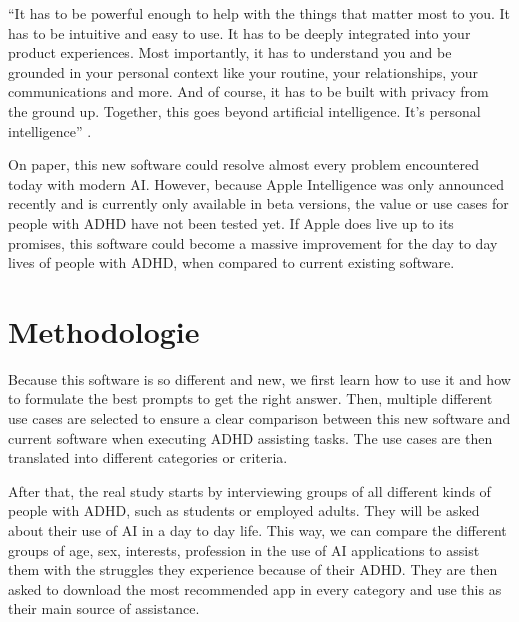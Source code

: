 \documentclass[english]{hogent-article}
\begin{document}
“It has to be powerful enough to help with the things that matter most to you. It has to be intuitive and easy to use. It has to be deeply integrated into your product experiences. Most importantly, it has to understand you and be grounded in your personal context like your routine, your relationships, your communications and more. And of course, it has to be built with privacy from the ground up. Together, this goes beyond artificial intelligence. It's personal intelligence” \autocite{Cook2024}.

On paper, this new software could resolve almost every problem encountered today with modern AI. However, because Apple Intelligence was only announced recently and is currently only available in beta versions, the value or use cases for people with ADHD have not been tested yet. If Apple does live up to its promises, this software could become a massive improvement for the day to day lives of people with ADHD, when compared to current existing software. 



\section{Methodologie}%
\label{sec:methodologie}


Because this software is so different and new, we first learn how to use it and how to formulate the best prompts to get the right answer. Then, multiple different use cases are selected to ensure a clear comparison between this new software and current software when executing ADHD assisting tasks. The use cases are then translated into different categories or criteria. 

After that, the real study starts by interviewing groups of all different kinds of people with ADHD, such as students or employed adults. They will be asked about their use of AI in a day to day life. This way, we can compare the different groups of age, sex, interests, profession in the use of AI applications to assist them with the struggles they experience because of their ADHD. They are then asked to download the most recommended app in every category and use this as their main source of assistance. 
\end{document}
